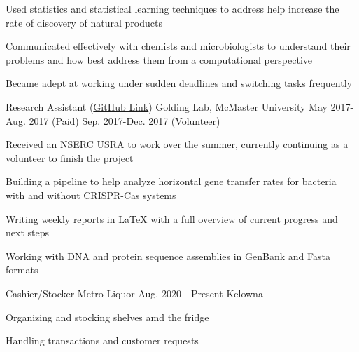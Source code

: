 \begin{cventries}
{\begin{cvitems}
         \item {Used statistics and statistical learning techniques to address help increase the rate of discovery of natural products}
         \item {Communicated effectively with chemists and microbiologists to understand their problems and how best address them from a computational perspective}
         \item {Became adept at working under sudden deadlines and switching tasks frequently}
        \end{cvitems}
      }
    \cventry
      {Research Assistant (\href{https://github.com/DJSiddharthVader/summer2017}{GitHub Link})}
      {Golding Lab, McMaster University}
      {May 2017-Aug. 2017 (Paid)}
      {Sep. 2017-Dec. 2017 (Volunteer)}
      {
        \begin{cvitems}
          \item {Received an NSERC USRA to work over the summer, currently continuing as a volunteer to finish the project}
          \item {Building a pipeline to help analyze horizontal gene transfer rates for bacteria with and without CRISPR-Cas systems}
          \item {Writing weekly reports in LaTeX with a full overview of current progress and next steps}
          \item {Working with DNA and protein sequence assemblies in GenBank and Fasta formats}
        \end{cvitems}
      }
  \cventry
    {Cashier/Stocker} %
    {Metro Liquor} %
    {Aug. 2020 - Present} %
    {Kelowna} %
    {
      \begin{cvitems} %
      \item {Organizing and stocking shelves amd the fridge}
      \item {Handling transactions and customer requests}
      \end{cvitems}
    }
\end{cventries}

